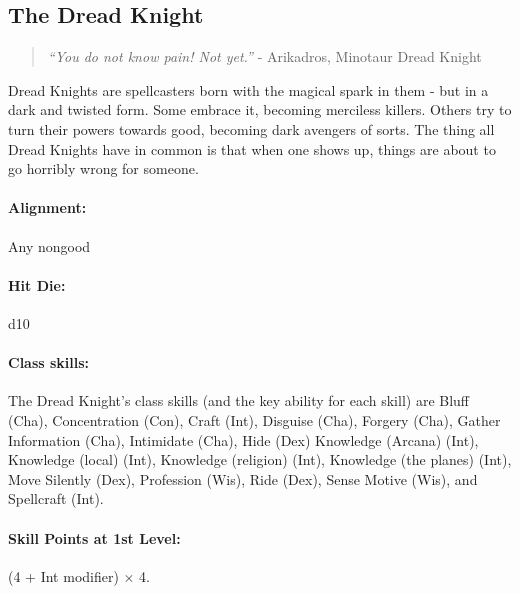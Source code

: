 \subsection[Dread Knight]{The Dread Knight}
\label{sec:DreadKnight}
\begin{quote}
\emph{``You do not know pain! Not yet.''}
- Arikadros, Minotaur Dread Knight
\end{quote}

Dread Knights are spellcasters born with the magical spark in them - but in a dark and twisted form. Some embrace it, becoming merciless killers.
Others try to turn their powers towards good, becoming dark avengers of sorts.
The thing all Dread Knights have in common is that when one shows up, things are about to go horribly wrong for someone.
\paragraph{Alignment:} Any nongood
\paragraph{Hit Die:} d10
\paragraph{Class skills:}
The Dread Knight's class skills (and the key ability for each skill) are Bluff (Cha), Concentration (Con), Craft (Int), Disguise (Cha), Forgery (Cha), Gather Information (Cha), Intimidate (Cha), Hide (Dex) Knowledge (Arcana) (Int), Knowledge (local) (Int), Knowledge (religion) (Int), Knowledge (the planes) (Int), Move Silently (Dex), Profession (Wis), Ride (Dex), Sense Motive (Wis), and Spellcraft (Int).

\paragraph{Skill Points at 1st Level:} (4 + Int modifier) $\times$ 4.
